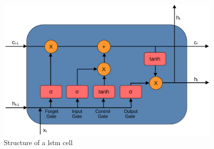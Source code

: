 \begin{figure}[h]
    \centering
    \includegraphics[scale=0.20]{images/lstm_cell.png}
    \caption{Structure of a \acrshort{lstm} cell}
    \label{fig:lstm_cell}
\end{figure}

